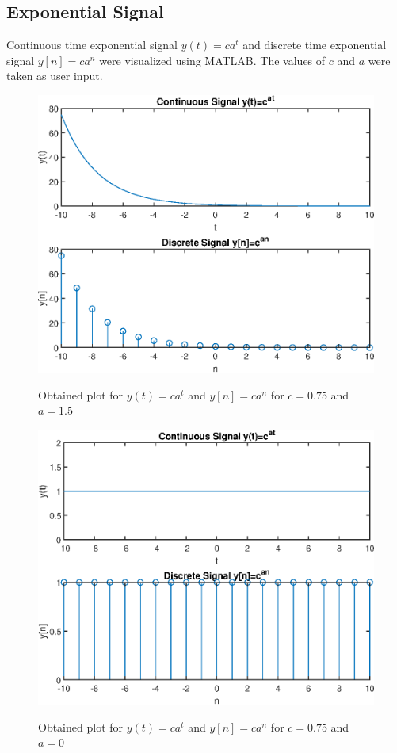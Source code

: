 \documentclass{lab_sheet}
\begin{document}
    \subsection{Exponential Signal}
    Continuous time exponential signal $y(t)=ca^t$ and discrete time exponential signal $y[n]=ca^n$ were visualized using MATLAB. The values of $c$ and $a$ were taken as user input.
    \begin{figure}[H]
        \centering
        \includegraphics[scale=0.6]{./Figures/powered_1}
        \label{fig:power1}
        \caption{Obtained plot for $y(t)=ca^t$ and $y[n]=ca^n$ for $c=0.75$ and $a=1.5$}
    \end{figure}

    \begin{figure}[H]
        \centering
        \includegraphics[scale=0.6]{./Figures/powered_3}
        \label{fig:power3}
        \caption{Obtained plot for $y(t)=ca^t$ and $y[n]=ca^n$ for $c=0.75$ and $a=0$}
    \end{figure}
\end{document}
